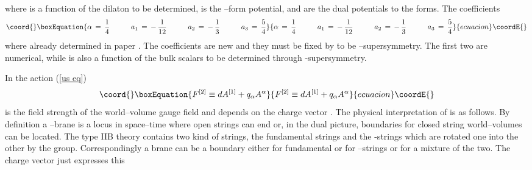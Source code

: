 \documentclass[a4paper,11pt]{article}
\begin{document}
where \myHighlight{$\rho \, = \, \rho(\phi)$}\coordHE{} is a function of the dilaton to be determined,
\coordHE{} is the \coordHE{}--form potential, and \coordHE{} are the dual potentials to
the \coordHE{} forms. The coefficients
\begin{equation}\coord{}\boxEquation{
\alpha\, = \, \frac{1}{4} \hspace{1cm} a_1 \, = \, - \, \frac{1}{12}  \hspace{1cm} a_2 \, = \, - \,
\frac{1}{3} \hspace{1cm}
  a_3\, = \, \frac{5}{4}
\label{repetita}
}{
\alpha\, = \, \frac{1}{4} \hspace{1cm} a_1 \, = \, - \, \frac{1}{12}  \hspace{1cm} a_2 \, = \, - \,
\frac{1}{3} \hspace{1cm}
  a_3\, = \, \frac{5}{4}
}{ecuacion}\coordE{}\end{equation}
where already determined in paper \cite{noidued3}. The coefficients \coordHE{} are new
and they must be fixed by to be \myHighlight{$\kappa$}\coordHE{}--supersymmetry. The first two
are numerical, while \myHighlight{$\nu$}\coordHE{} is  also a function  of the bulk scalars to be determined through
\myHighlight{$\kappa$}\coordHE{}-supersymmetry.
\par
In the action (\ref{us eq})
\begin{equation}\coord{}\boxEquation{
  F^{[2]} \equiv dA^{[1]} + q_{\alpha} A^{\alpha}
\label{nFdefidA}
}{
  F^{[2]} \equiv dA^{[1]} + q_{\alpha} A^{\alpha}
}{ecuacion}\coordE{}\end{equation}
is the field strength of the world--volume gauge field and depends on
the charge vector \coordHE{}. The physical interpretation of
\coordHE{} is as follows. By definition a \coordHE{}--brane is a locus in
space--time where open strings can end or, in the dual picture,
boundaries for closed string world--volumes can be located. The type IIB theory contains
two kind of strings, the fundamental strings and the \coordHE{}-strings
which are rotated one into the other by the \coordHE{} group. Correspondingly a \coordHE{} brane can be
a boundary either for fundamental or for \coordHE{}--strings or for a
mixture of the two. The charge vector \coordHE{} just expresses this
\end{document}
